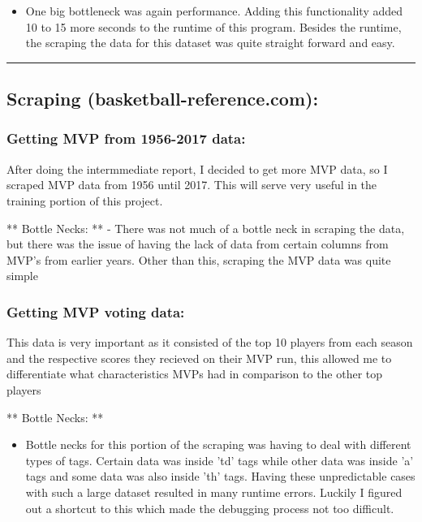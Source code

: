\documentclass[11pt]{article}
\providecommand{\tightlist}{%
      \setlength{\itemsep}{0pt}\setlength{\parskip}{0pt}}
\begin{document}
\begin{itemize}
\tightlist
\item
  One big bottleneck was again performance. Adding this functionality
  added 10 to 15 more seconds to the runtime of this program. Besides
  the runtime, the scraping the data for this dataset was quite straight
  forward and easy.
\end{itemize}

\begin{center}\rule{0.5\linewidth}{\linethickness}\end{center}

    \subsection{Scraping
(basketball-reference.com):}\label{scraping-basketball-reference.com}

    \subsubsection{Getting MVP from 1956-2017
data:}\label{getting-mvp-from-1956-2017-data}

After doing the intermmediate report, I decided to get more MVP data, so
I scraped MVP data from 1956 until 2017. This will serve very useful in
the training portion of this project.

** Bottle Necks: ** - There was not much of a bottle neck in scraping
the data, but there was the issue of having the lack of data from
certain columns from MVP's from earlier years. Other than this, scraping
the MVP data was quite simple

    \subsubsection{Getting MVP voting data:}\label{getting-mvp-voting-data}

This data is very important as it consisted of the top 10 players from
each season and the respective scores they recieved on their MVP run,
this allowed me to differentiate what characteristics MVPs had in
comparison to the other top players

** Bottle Necks: **

\begin{itemize}
\tightlist
\item
  Bottle necks for this portion of the scraping was having to deal with
  different types of tags. Certain data was inside 'td' tags while other
  data was inside 'a' tags and some data was also inside 'th' tags.
  Having these unpredictable cases with such a large dataset resulted in
  many runtime errors. Luckily I figured out a shortcut to this which
  made the debugging process not too difficult.
\end{itemize}
\end{document}
